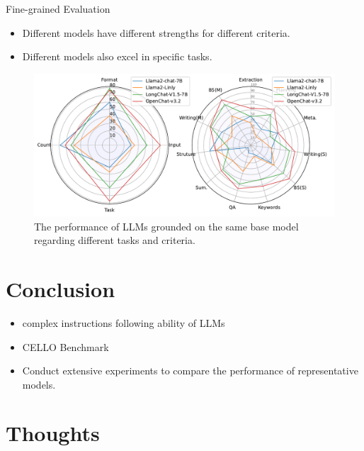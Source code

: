 \documentclass{beamer}
\begin{document}
\begin{frame}{Fine-grained Evaluation}
    \begin{itemize}
        \item {Different models have different strengths for different criteria.}
        \item {Different models also excel in specific tasks.}
    \end{itemize}
    \begin{figure}[h]
        \centering
        \includegraphics[width=0.9\linewidth]{./images/figures/discrim_v1.pdf}
        \caption{The performance of LLMs grounded on the same base model regarding different tasks and criteria.}
    \end{figure}
\end{frame}

\section{Conclusion}

\begin{frame}
    \begin{itemize}
        \item {complex instructions following ability of LLMs}
        \item {CELLO Benchmark}
        \item {Conduct extensive experiments to compare the performance of representative models.}
    \end{itemize}
\end{frame}

\section{Thoughts}
\end{document}
